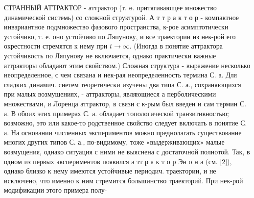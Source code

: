 \documentclass[10pt]{article}
\begin{document}
СТРАННЫЙ АТТРАКТОР - аттрактор (т. ө. притягивающее множество динамической системь) со сложной структурой. А т т р а к т о р - компактное инвариантное подмножество фазового пространства, к-рое асимптотически устойчиво, т. е. оно устойчиво по Ляпунову, и все траектории из нек-рой его окрестности стремятся к нему при $t \rightarrow \infty$. (Иногда в понятие аттрактора устойчивость по Ляпунову не включается, однако практически важные аттракторы обладают этим свойством.) Сложная структура - выражение несколько неопределенное, с чем связана и нек-рая неопределенность термина С. а. Для гладких динамич. сиетем теоретически изучены два типа С. а., сохраняющихся при малых возмущениях, - аттракторы, являющиеся $а$ перболическими множествами, и Лоренца аттрактор, в связи с к-рым был введен и сам термин С. а. В обоих этих примерах С. а. обладает топологической транзитивностью; возможно, это или какое-то родственное свойство следует включать в понятие С. а. На основании численных экспериментов можно преднолагать существование многих других типов С. а., по-видимому, тоже «выдерживающих» малые возмущения, однако ситуация с ними не выяснена с достаточной полнотой. Так, в одном из первых экспериментов появился а тт р а к т о р Эн о н а (см. [2]), однако близко к нему имеются устойчивые периодич. траектории, и не исключено, что именно к ним стремится большинство траекторий. При нек-рой модификации этого примера полу-
\end{document}
